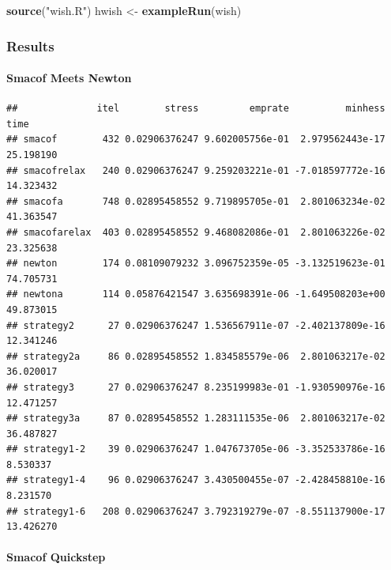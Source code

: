 \documentclass[
  12pt,
]{article}
\newenvironment{Shaded}{\begin{snugshade}}{\end{snugshade}}
\newcommand{\AttributeTok}[1]{\textcolor[rgb]{0.13,0.29,0.53}{#1}}
\newcommand{\DecValTok}[1]{\textcolor[rgb]{0.00,0.00,0.81}{#1}}
\newcommand{\FunctionTok}[1]{\textcolor[rgb]{0.13,0.29,0.53}{\textbf{#1}}}
\newcommand{\NormalTok}[1]{#1}
\newcommand{\OtherTok}[1]{\textcolor[rgb]{0.56,0.35,0.01}{#1}}
\newcommand{\SpecialCharTok}[1]{\textcolor[rgb]{0.81,0.36,0.00}{\textbf{#1}}}
\newcommand{\StringTok}[1]{\textcolor[rgb]{0.31,0.60,0.02}{#1}}
\begin{document}
\begin{Shaded}
\begin{Highlighting}[]
\FunctionTok{source}\NormalTok{(}\StringTok{"wish.R"}\NormalTok{)}
\NormalTok{hwish }\OtherTok{\textless{}{-}} \FunctionTok{exampleRun}\NormalTok{(wish)}
\end{Highlighting}
\end{Shaded}

\subsubsection{Results}\label{results-6}

\paragraph{Smacof Meets Newton}\label{smacof-meets-newton-6}

\begin{verbatim}
##              itel        stress         emprate          minhess      time
## smacof        432 0.02906376247 9.602005756e-01  2.979562443e-17 25.198190
## smacofrelax   240 0.02906376247 9.259203221e-01 -7.018597772e-16 14.323432
## smacofa       748 0.02895458552 9.719895705e-01  2.801063234e-02 41.363547
## smacofarelax  403 0.02895458552 9.468082086e-01  2.801063226e-02 23.325638
## newton        174 0.08109079232 3.096752359e-05 -3.132519623e-01 74.705731
## newtona       114 0.05876421547 3.635698391e-06 -1.649508203e+00 49.873015
## strategy2      27 0.02906376247 1.536567911e-07 -2.402137809e-16 12.341246
## strategy2a     86 0.02895458552 1.834585579e-06  2.801063217e-02 36.020017
## strategy3      27 0.02906376247 8.235199983e-01 -1.930590976e-16 12.471257
## strategy3a     87 0.02895458552 1.283111535e-06  2.801063217e-02 36.487827
## strategy1-2    39 0.02906376247 1.047673705e-06 -3.352533786e-16  8.530337
## strategy1-4    96 0.02906376247 3.430500455e-07 -2.428458810e-16  8.231570
## strategy1-6   208 0.02906376247 3.792319279e-07 -8.551137900e-17 13.426270
\end{verbatim}

\paragraph{Smacof Quickstep}\label{smacof-quickstep-6}

\begin{Shaded}
\end{Shaded}
\end{document}
